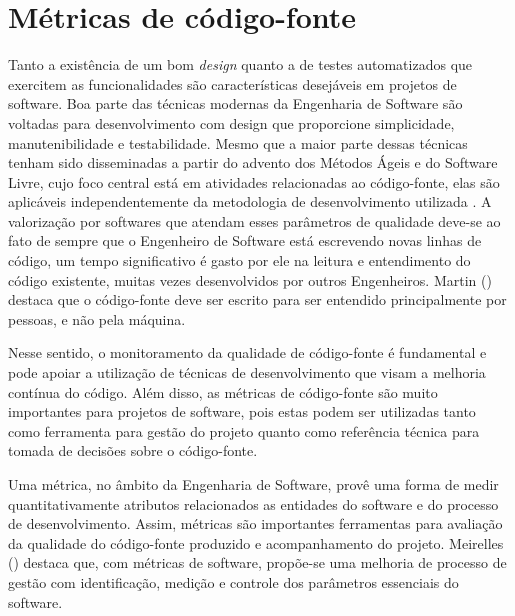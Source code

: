 %


%


\section{Métricas de código-fonte}
\label{sec-metrics-esw} 



Tanto a existência de um bom \emph{design} quanto a de testes automatizados que exercitem as funcionalidades são características desejáveis em projetos de software. Boa parte das técnicas modernas da Engenharia de Software são voltadas para desenvolvimento com design que proporcione simplicidade, manutenibilidade e testabilidade. Mesmo que a maior parte dessas técnicas tenham sido disseminadas a partir do advento dos Métodos Ágeis e do Software Livre, cujo foco central está em atividades relacionadas ao código-fonte, elas são aplicáveis independentemente da metodologia de desenvolvimento utilizada \cite{meirelles2013metrics}. A valorização por softwares que atendam esses parâmetros de qualidade deve-se ao fato de sempre que o Engenheiro de Software está escrevendo novas linhas de código, um tempo significativo é gasto por ele na leitura e entendimento do código existente, muitas vezes desenvolvidos por outros Engenheiros. Martin (\citeyear{martin2008}) destaca que o código-fonte deve ser escrito para ser entendido principalmente por pessoas, e não pela máquina.

%

Nesse sentido, o monitoramento da qualidade de código-fonte é fundamental e pode apoiar a utilização de técnicas de desenvolvimento que visam a melhoria contínua do código. Além disso, as métricas de código-fonte são muito importantes para projetos de software, pois estas podem ser utilizadas tanto como ferramenta para gestão do projeto quanto como referência técnica para tomada de decisões sobre o código-fonte.

%

Uma métrica, no âmbito da Engenharia de Software, provê uma forma de medir quantitativamente atributos relacionados as entidades do software e do processo de desenvolvimento. Assim, métricas são importantes ferramentas para avaliação da qualidade do código-fonte produzido e acompanhamento do projeto. Meirelles (\citeyear{meirelles2013metrics}) destaca que, com métricas de software, propõe-se uma melhoria de processo de gestão com identificação, medição e controle dos parâmetros essenciais do software.

